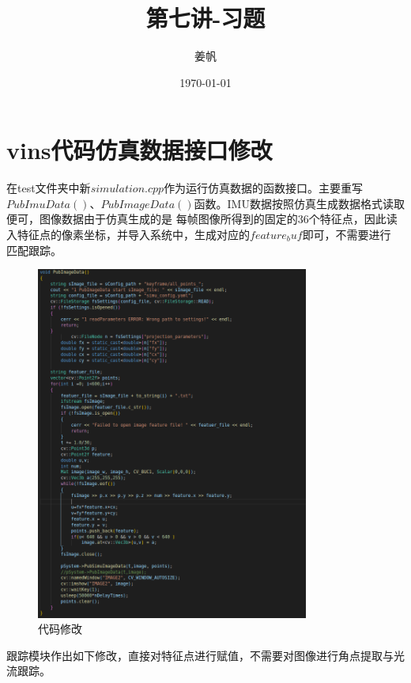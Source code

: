 \documentclass[UTF8]{ctexart}
\title{第七讲-习题}
\author{姜帆}
\date{\today}
\begin{document}
\maketitle
\tableofcontents
\newpage
\section{vins代码仿真数据接口修改}
\indent 在test文件夹中新$simulation.cpp$作为运行仿真数据的函数接口。主要重写
$PubImuData()、PubImageData()$函数。IMU数据按照仿真生成数据格式读取便可，图像数据由于仿真生成的是
每帧图像所得到的固定的36个特征点，因此读入特征点的像素坐标，并导入系统中，生成对应的$feature_buf$即可，不需要进行
匹配跟踪。\\
\begin{figure}[H]
\centering
\includegraphics[width=0.8\textwidth]{1.png}    
\caption{代码修改}
\label{img0}
\end{figure}
\indent 跟踪模块作出如下修改，直接对特征点进行赋值，不需要对图像进行角点提取与光流跟踪。\\
\end{document}
